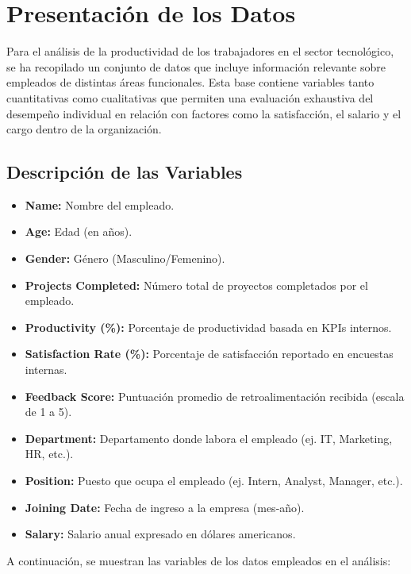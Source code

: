 \section{Presentación de los Datos}

Para el análisis de la productividad de los trabajadores en el sector tecnológico, se ha recopilado un conjunto de datos que incluye información relevante sobre empleados de distintas áreas funcionales. Esta base contiene variables tanto cuantitativas como cualitativas que permiten una evaluación exhaustiva del desempeño individual en relación con factores como la satisfacción, el salario y el cargo dentro de la organización.

\subsection{Descripción de las Variables}

\begin{itemize}
    \item \textbf{Name:} Nombre del empleado.
    \item \textbf{Age:} Edad (en años).
    \item \textbf{Gender:} Género (Masculino/Femenino).
    \item \textbf{Projects Completed:} Número total de proyectos completados por el empleado.
    \item \textbf{Productivity (\%):} Porcentaje de productividad basada en KPIs internos.
    \item \textbf{Satisfaction Rate (\%):} Porcentaje de satisfacción reportado en encuestas internas.
    \item \textbf{Feedback Score:} Puntuación promedio de retroalimentación recibida (escala de 1 a 5).
    \item \textbf{Department:} Departamento donde labora el empleado (ej. IT, Marketing, HR, etc.).
    \item \textbf{Position:} Puesto que ocupa el empleado (ej. Intern, Analyst, Manager, etc.).
    \item \textbf{Joining Date:} Fecha de ingreso a la empresa (mes-año).
    \item \textbf{Salary:} Salario anual expresado en dólares americanos.
\end{itemize}

A continuación, se muestran las variables de los datos empleados en el análisis:


